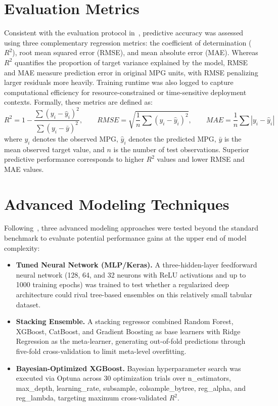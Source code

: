 \section{Evaluation Metrics}

Consistent with the evaluation protocol in~\cite{atique2026explainable}, predictive accuracy was assessed using three complementary regression metrics: the coefficient of determination ($R^2$), root mean squared error (RMSE), and mean absolute error (MAE). Whereas $R^2$ quantifies the proportion of target variance explained by the model, RMSE and MAE measure prediction error in original MPG units, with RMSE penalizing larger residuals more heavily. Training runtime was also logged to capture computational efficiency for resource-constrained or time-sensitive deployment contexts. Formally, these metrics are defined as:
\begin{equation}
R^2 = 1 - \frac{\sum (y_i-\hat{y}_i)^2}
{\sum (y_i-\bar{y})^2},
\qquad
RMSE = \sqrt{\frac{1}{n}\sum (y_i-\hat{y}_i)^2},
\qquad
MAE = \frac{1}{n}\sum |y_i-\hat{y}_i|
\end{equation}
where $y_i$ denotes the observed MPG, $\hat{y}_i$ denotes the predicted MPG, $\bar{y}$ is the mean observed target value, and $n$ is the number of test observations. Superior predictive performance corresponds to higher $R^2$ values and lower RMSE and MAE values.


\section{Advanced Modeling Techniques}

Following~\cite{atique2026explainable}, three advanced modeling approaches were tested beyond the standard benchmark to evaluate potential performance gains at the upper end of model complexity:

\begin{itemize}

\item \textbf{Tuned Neural Network (MLP/Keras).}
A three-hidden-layer feedforward neural network (128, 64, and 32 neurons with ReLU activations and up to 1000 training epochs) was trained to test whether a regularized deep architecture could rival tree-based ensembles on this relatively small tabular dataset.

\item \textbf{Stacking Ensemble.}
A stacking regressor combined Random Forest, XGBoost, CatBoost, and Gradient Boosting as base learners with Ridge Regression as the meta-learner, generating out-of-fold predictions through five-fold cross-validation to limit meta-level overfitting.

\item \textbf{Bayesian-Optimized XGBoost.}
Bayesian hyperparameter search was executed via Optuna across 30 optimization trials over n\_estimators, max\_depth, learning\_rate, subsample, colsample\_bytree, reg\_alpha, and reg\_lambda, targeting maximum cross-validated $R^2$.

\end{itemize}


